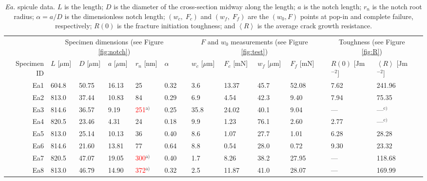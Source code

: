 \documentclass[12pt,onecolumn]{article}
\makeatletter
\newcommand{\EA}{\textit{Ea.\@}\xspace}
\newcommand{\ra}[1]{\renewcommand{\arraystretch}{#1}}
\makeatother
\begin{document}
 
\clearpage
\thispagestyle{empty}
\begin{landscape}

\begin{table}
\small
\centering
\caption{\EA spicule data. $L$ is the length; $D$ is the diameter of the cross-section midway along the length; $a$ is the notch length; $r_n$ is the notch root radius; $\alpha=a/D$ is the dimensionless notch length; $(w_c,\;F_c)$ and $(w_f,\;F_f)$ are the $(w_0,F)$ points at pop-in and complete failure, respectively; $R(0)$ is the fracture initiation toughness; and $\left< R \right>$ is the average crack growth resistance.}
\label{tab:EAdata}
\ra{1.25}
\begin{threeparttable}[t]
\begin{tabular}{rllllllllllllll}
\toprule
& \multicolumn{5}{c}{Specimen dimensions (see Figure \ref{fig:notch})} & & \multicolumn{4}{c}{$F$ and $w_0$ measurements (see Figure \ref{fig:test})} & & \multicolumn{2}{c}{Toughness (see Figure \ref{fig:R})} \\
\cmidrule{2-6} \cmidrule{8-11} \cmidrule{13-14}
Specimen ID & $L$ [$\mu$m] & $D$ [$\mu$m] & $a$ [$\mu$m] & $r_n$ [nm] & $\alpha$ & & $w_c$ [$\mu$m] & $F_c$ [mN] & $w_f$ [$\mu$m] & $F_f$ [mN] & & $R(0)$ [Jm$^{-2}$] & $\left< R \right>$ [Jm$^{-2}$] \\
\midrule
Ea1 & 604.8 & 50.75 & 16.13 &   25 & 0.32 &  &  3.6 & 13.37 & 45.7 & 52.08 &  & 7.62 &241.96 \\ 
Ea2 & 813.0 & 37.44 & 10.83 &   84 & 0.29 &  &  6.9 & 4.54 & 42.3 & 9.40 &  & 7.94 &75.35 \\ 
Ea3 & 814.6 & 36.57 & 9.19 &  \textcolor{red}{251}$^\text{a)}$ & 0.25 &  & 35.8 & 24.02 & 40.1 & 9.04 &  & --- &---$^\text{c)}$\\ 
Ea4 & 820.5 & 23.46 & 4.31 &   24 & 0.18 &  &  9.9 & 1.23 & 76.1 & 2.60 &  & 2.77 &---$^\text{c)}$\\ 
Ea5 & 813.0 & 25.14 & 10.13 &   36 & 0.40 &  &  8.6 & 1.07 & 27.7 & 1.01 &  & 6.28 &28.28 \\ 
Ea6 & 814.6 & 21.60 & 13.81 &   77 & 0.64 &  &  8.8 & 0.54 & 28.0 & 0.72 &  & 9.30 &23.32 \\ 
Ea7 & 820.5 & 47.07 & 19.05 &  \textcolor{red}{300}$^\text{a)}$ & 0.40 &  &  1.7 & 8.26 & 38.2 & 27.95 &  & --- &118.68 \\ 
Ea8 & 813.0 & 46.79 & 14.90 &  \textcolor{red}{372}$^\text{a)}$ & 0.32 &  &  2.5 & 11.87 & 41.0 & 28.07 &  & --- &169.99 \\ 

\end{tabular}
\end{threeparttable}
\end{table}
\end{landscape}
\end{document}
